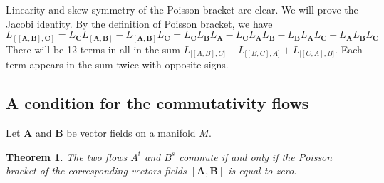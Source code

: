 \documentclass[leqno]{report}
\numberwithin{equation}{section}
\theoremstyle{plain}
\newtheorem*{thm*}{Theorem}
\let\oldendproof\endproof
\renewenvironment{proof}[1][\proofname]{%
  \oldproof[\textsc{#1}]%
}{\oldendproof}
\theoremstyle{definition}
\theoremstyle{remark}
\theoremstyle{smallcap}
\numberwithin{prob}{section}
\begin{document}
\begin{proof}
  Linearity and skew-symmetry of the Poisson bracket are clear.
  We will prove the Jacobi identity. By the definition of Poisson bracket,
  we have
  $$
  L_\mathbf{ [[A, B], C]} =
  L_{\mathbf C} L_\mathbf{ [A, B] } -L_\mathbf{ [A, B]} L_{\mathbf C}
  =
   L_{\mathbf C} L_{\mathbf B} L_{\mathbf A}
  -L_{\mathbf C} L_{\mathbf A} L_{\mathbf B}
  -L_{\mathbf B} L_{\mathbf A} L_{\mathbf C}
  +L_{\mathbf A} L_{\mathbf B} L_{\mathbf C}
  $$
  There will be 12 terms in all in the sum
  $ L_{\mathbf [[A, B], C]} + L_{\mathbf [[B, C], A]} + L_{\mathbf [[C, A], B]}$.
  Each term appears in the sum twice with opposite signs.
\end{proof}

\subsection{A condition for the commutativity flows}

Let $\mathbf{A}$ and $\mathbf{B}$ be vector fields
on a manifold $M$.

\begin{thm*}
  The two flows $A^t$ and $B^s$ commute if and only if
  the Poisson bracket of the corresponding vectors fields
  $[\mathbf A, \mathbf B]$ is equal to zero.
\end{thm*}
\end{document}
